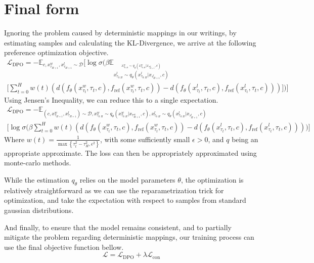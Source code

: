 \documentclass[10pt]{article}
\begin{document}
\clearpage

\section{Final form}

Ignoring the problem caused by deterministic mappings in our writings, by estimating samples and calculating the KL-Divergence, we arrive at the following preference optimization objective.
\begin{multline}\label{eqn:ldpo_after_est}
	\mathcal{L}_\text{DPO}=-\mathbb{E}_{c,x_{\tau_{H+1}}^w,x_{\tau_{H+1}}^l\sim\mathcal{D}}\Bigg[\log\sigma\Bigg(\beta\mathbb{E}_{
			\stackrel{x_{\tau_{0:H}}^w\sim q_\theta(x_{\tau_{0:H}}^w|x_{\tau_{H+1}^w},c)}{x_{\tau_{0:H}}^l\sim q_\theta(x_{\tau_{0:H}}^l|x_{\tau_{H+1}^l},c)}}
		\\\Bigg[\sum_{t=0}^H
			w(t)\left(d(f_\theta(x^w_{\tau_t},\tau_t,c),f_\text{ref}(x^w_{\tau_t},\tau_t,c))
			-d(f_\theta(x^l_{\tau_t},\tau_t,c),f_\text{ref}(x^l_{\tau_t},\tau_t,c))\right) \Bigg]\Bigg)\Bigg]
\end{multline}
Using Jensen's Inequality, we can reduce this to a single expectation.
\begin{multline}\label{eqn:ldpo_after_est_jensen}
	\mathcal{L}_\text{DPO}=-\mathbb{E}_{(c,x_{\tau_{H+1}}^w,x_{\tau_{H+1}}^l)\sim\mathcal{D}, x_{\tau_{0:H}}^w\sim q_\theta(x_{\tau_{0:H}}^w|x_{\tau_{H+1}^w},c), x_{\tau_{0:H}}^l\sim q_\theta(x_{\tau_{0:H}}^l|x_{\tau_{H+1}^l},c)}\\
	\Bigg[\log\sigma\Bigg(\beta\sum_{t=0}^H
			w(t)\left(d(f_\theta(x^w_{\tau_t},\tau_t,c),f_\text{ref}(x^w_{\tau_t},\tau_t,c))
			-d(f_\theta(x^l_{\tau_t},\tau_t,c),f_\text{ref}(x^l_{\tau_t},\tau_t,c))\right)\Bigg)\Bigg]
\end{multline}
Where $w(t)=\frac{1}{\max\left\{\tau_t^2-\tau_H^2, \epsilon^2\right\}}$, with some sufficiently small $\epsilon>0$, and $q$ being an appropriate approximate. The loss can then be appropriately approximated using monte-carlo methods.

While the estimation $q_\theta$ relies on the model parameters $\theta$, the optimization is relatively straightforward as we can use the reparametrization trick for optimization, and take the expectation with respect to samples from standard gaussian distributions.

And finally, to ensure that the model remains consistent, and to partially mitigate the problem regarding deterministic mappings, our training process can use the final objective function bellow.
\begin{equation}
    \mathcal{L}=\mathcal{L}_\text{DPO}+\lambda\mathcal{L}_\text{con}
\end{equation}
\end{document}
